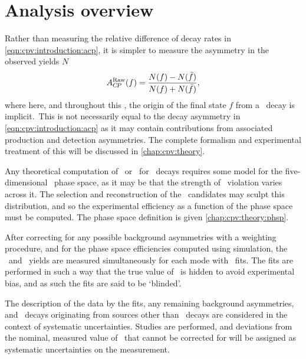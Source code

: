 \section{Analysis overview}
\label{chap:cpv:introduction:overview}

Rather than measuring the relative difference of decay rates in 
\cref{eqn:cpv:introduction:acp}, it is simpler to measure the asymmetry in the 
observed yields $N$
\begin{equation}
  A_{C\!P}^{\textnormal{Raw}}(f) = \frac{N(f) - N(\bar{f})}{N(f) + N(\bar{f})},
  \label{eqn:cpv:introduction:araw}
\end{equation}
where here, and throughout this , the origin of the final 
state $f$ from a \PLambdac\ decay is implicit.\footnotemark\
This is not necessarily equal to the decay asymmetry in 
\cref{eqn:cpv:introduction:acp} as it may contain contributions from associated 
production and detection asymmetries.
The complete formalism and experimental treatment of this will be discussed in 
\cref{chap:cpv:theory}.


Any theoretical computation of \ACP\ or \dACP\ for \LcTophh\ decays requires 
some model for the five-dimensional \phh\ phase space, as it may be that the 
strength of \CP\ violation varies across it.
The selection and reconstruction of the \PLambdac\ candidates may sculpt this 
distribution, and so the experimental efficiency as a function of the phase 
space must be computed.
The phase space definition is given \cref{chap:cpv:theory:phsp}.

After correcting for any possible background asymmetries with a weighting 
procedure, and for the phase space efficiencies computed using simulation, the 
\PLambdac\ and \APLambdac\ yields are measured simultaneously for each mode 
with \chisq\ fits.
The fits are performed in such a way that the true value of \ARaw\ is hidden to 
avoid experimental bias, and as such the fits are said to be `blinded'.

The description of the data by the fits, any remaining background asymmetries, 
and \PLambdac\ decays originating from sources other than \PLambdab\ decays are 
considered in the context of systematic uncertainties.
Studies are performed, and deviations from the nominal, measured value of 
\dACP\ that cannot be corrected for will be assigned as systematic 
uncertainties on the measurement.

